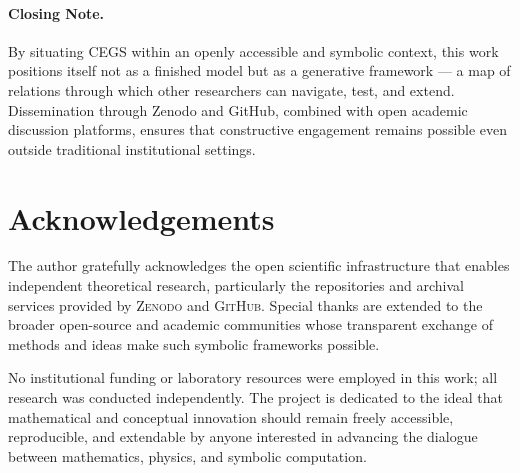\documentclass[11pt]{article}
\theoremstyle{plain}
\theoremstyle{definition}
\theoremstyle{remark}
\begin{document}
\paragraph{Closing Note.}
By situating CEGS within an openly accessible and symbolic context, this work positions itself not as a finished model but as a generative framework — a map of relations through which other researchers can navigate, test, and extend. 
Dissemination through Zenodo and GitHub, combined with open academic discussion platforms, ensures that constructive engagement remains possible even outside traditional institutional settings.

\vspace{12pt}
\section*{Acknowledgements}

The author gratefully acknowledges the open scientific infrastructure that enables independent theoretical research, particularly the repositories and archival services provided by \textsc{Zenodo} and \textsc{GitHub}. 
Special thanks are extended to the broader open-source and academic communities whose transparent exchange of methods and ideas make such symbolic frameworks possible.

No institutional funding or laboratory resources were employed in this work; all research was conducted independently. 
The project is dedicated to the ideal that mathematical and conceptual innovation should remain freely accessible, reproducible, and extendable by anyone interested in advancing the dialogue between mathematics, physics, and symbolic computation.
\end{document}
